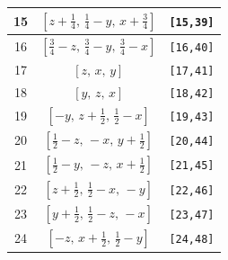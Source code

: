 \documentclass[fleqn,8pt]{jsarticle}
\begin{document}
\begin{longtable}{ccc}
15 & $\left[ z + \frac{1}{4},\, \frac{1}{4} - y,\, x + \frac{3}{4} \right]$ & {\tt [15,39]} \\ \hline
16 & $\left[ \frac{3}{4} - z,\, \frac{3}{4} - y,\, \frac{3}{4} - x \right]$ & {\tt [16,40]} \\ \hline
17 & $\left[ z,\, x,\, y \right]$ & {\tt [17,41]} \\ \hline
18 & $\left[ y,\, z,\, x \right]$ & {\tt [18,42]} \\ \hline
19 & $\left[ - y,\, z + \frac{1}{2},\, \frac{1}{2} - x \right]$ & {\tt [19,43]} \\ \hline
20 & $\left[ \frac{1}{2} - z,\, - x,\, y + \frac{1}{2} \right]$ & {\tt [20,44]} \\ \hline
21 & $\left[ \frac{1}{2} - y,\, - z,\, x + \frac{1}{2} \right]$ & {\tt [21,45]} \\ \hline
22 & $\left[ z + \frac{1}{2},\, \frac{1}{2} - x,\, - y \right]$ & {\tt [22,46]} \\ \hline
23 & $\left[ y + \frac{1}{2},\, \frac{1}{2} - z,\, - x \right]$ & {\tt [23,47]} \\ \hline
24 & $\left[ - z,\, x + \frac{1}{2},\, \frac{1}{2} - y \right]$ & {\tt [24,48]} \\
\end{longtable}
\end{document}
